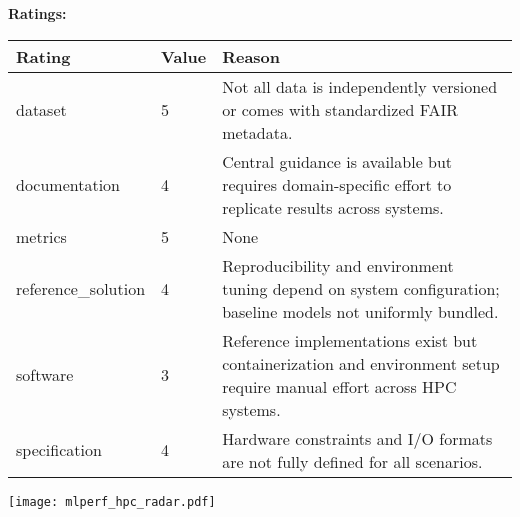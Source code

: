 {{{\bf Ratings:} ~ \\

\begin{tabular}{p{} p{} p{}}
\hline
Rating & Value & Reason \\
\hline
dataset & 5 & Not all data is independently versioned or comes with standardized FAIR metadata.
 \\
documentation & 4 & Central guidance is available but requires domain-specific effort to replicate results across systems.
 \\
metrics & 5 & None
 \\
reference\_solution & 4 & Reproducibility and environment tuning depend on system configuration; baseline models not uniformly bundled.
 \\
software & 3 & Reference implementations exist but containerization and environment setup require manual effort across HPC systems.
 \\
specification & 4 & Hardware constraints and I/O formats are not fully defined for all scenarios.
 \\
\hline
\end{tabular}

\texttt{[image: mlperf\_hpc\_radar.pdf]}
}}
\clearpage